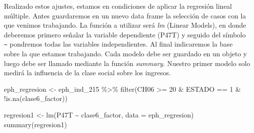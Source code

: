 \documentclass[
]{book}
\newenvironment{Shaded}{\begin{snugshade}}{\end{snugshade}}
\newcommand{\AttributeTok}[1]{\textcolor[rgb]{0.77,0.63,0.00}{#1}}
\newcommand{\DecValTok}[1]{\textcolor[rgb]{0.00,0.00,0.81}{#1}}
\newcommand{\FunctionTok}[1]{\textcolor[rgb]{0.00,0.00,0.00}{#1}}
\newcommand{\NormalTok}[1]{#1}
\newcommand{\OtherTok}[1]{\textcolor[rgb]{0.56,0.35,0.01}{#1}}
\newcommand{\SpecialCharTok}[1]{\textcolor[rgb]{0.00,0.00,0.00}{#1}}
\newcommand{\StringTok}[1]{\textcolor[rgb]{0.31,0.60,0.02}{#1}}
\begin{document}
\begin{Shaded}
\end{Shaded}

Realizado estos ajustes, estamos en condiciones de aplicar la regresión lineal múltiple. Antes guardaremos en un nuevo data frame la selección de casos con la que venimos trabajando. La función a utilizar será \emph{lm} (Linear Models), en donde deberemos primero señalar la variable dependiente (P47T) y seguido del símbolo \texttt{\textasciitilde{}} pondremos todas las variables independientes. Al final indicaremos la base sobre la que estamos trabajando. Cada modelo debe ser guardado en un objeto y luego debe ser llamado mediante la función \emph{summary}. Nuestro primer modelo solo medirá la influencia de la clase social sobre los ingresos.

\begin{Shaded}
\begin{Highlighting}[]
\NormalTok{eph\_regresion }\OtherTok{\textless{}{-}}\NormalTok{ eph\_ind\_215 }\SpecialCharTok{\%\textgreater{}\%} 
    \FunctionTok{filter}\NormalTok{(CH06 }\SpecialCharTok{\textgreater{}=} \DecValTok{20} \SpecialCharTok{\&}\NormalTok{ ESTADO }\SpecialCharTok{==} \DecValTok{1} \SpecialCharTok{\&} \SpecialCharTok{!}\FunctionTok{is.na}\NormalTok{(clase6\_factor))}

\NormalTok{regresion1 }\OtherTok{\textless{}{-}} \FunctionTok{lm}\NormalTok{(P47T }\SpecialCharTok{\textasciitilde{}}\NormalTok{ clase6\_factor, }\AttributeTok{data =}\NormalTok{ eph\_regresion)}
\FunctionTok{summary}\NormalTok{(regresion1)}
\end{Highlighting}
\end{Shaded}
\end{document}
